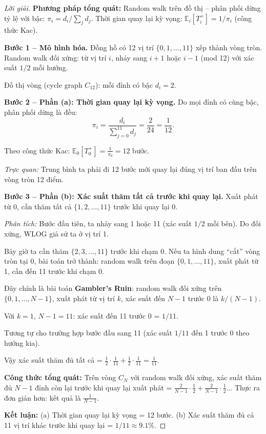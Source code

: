 \documentclass[8pt,a4paper]{article}
\newenvironment{solution}{\begin{proof}[Lời giải]}{\end{proof}}
\newcommand{\E}{\mathbb{E}}
\begin{document}
\begin{solution}
\textbf{Phương pháp tổng quát:} Random walk trên đồ thị -- phân phối dừng tỷ lệ với bậc: $\pi_i = d_i / \sum_j d_j$. Thời gian quay lại kỳ vọng: $\E_i[T_i^+] = 1/\pi_i$ (công thức Kac).

\textbf{Bước 1 -- Mô hình hóa.}
Đồng hồ có 12 vị trí $\{0, 1, \ldots, 11\}$ xếp thành vòng tròn. Random walk đối xứng: từ vị trí $i$, nhảy sang $i+1$ hoặc $i-1$ (mod 12) với xác suất $1/2$ mỗi hướng.

Đồ thị vòng (cycle graph $C_{12}$): mỗi đỉnh có bậc $d_i = 2$.

\textbf{Bước 2 -- Phần (a): Thời gian quay lại kỳ vọng.}
Do mọi đỉnh có cùng bậc, phân phối dừng là đều:
\[
  \pi_i = \frac{d_i}{\sum_{j=0}^{11} d_j} = \frac{2}{24} = \frac{1}{12}.
\]

Theo công thức Kac: $\E_0[T_0^+] = \frac{1}{\pi_0} = 12$ bước.

\textit{Trực quan:} Trung bình ta phải đi 12 bước mới quay lại đúng vị trí ban đầu trên vòng tròn 12 điểm.

\textbf{Bước 3 -- Phần (b): Xác suất thăm tất cả trước khi quay lại.}
Xuất phát từ 0, cần thăm tất cả $\{1, 2, \ldots, 11\}$ trước khi quay lại 0.

\textit{Phân tích:} Bước đầu tiên, ta nhảy sang 1 hoặc 11 (xác suất $1/2$ mỗi bên). Do đối xứng, WLOG giả sử ta ở vị trí 1.

Bây giờ ta cần thăm $\{2, 3, \ldots, 11\}$ trước khi chạm 0. Nếu ta hình dung ``cắt'' vòng tròn tại 0, bài toán trở thành: random walk trên đoạn $\{0, 1, \ldots, 11\}$, xuất phát từ 1, cần đến 11 trước khi chạm 0.

Đây chính là bài toán \textbf{Gambler's Ruin}: random walk đối xứng trên $\{0, 1, \ldots, N-1\}$, xuất phát từ vị trí $k$, xác suất đến $N-1$ trước 0 là $k/(N-1)$.

Với $k=1$, $N-1 = 11$: xác suất đến 11 trước 0 = $1/11$.

Tương tự cho trường hợp bước đầu sang 11 (xác suất $1/11$ đến 1 trước 0 theo hướng kia).

Vậy xác suất thăm đủ tất cả = $\frac{1}{2} \cdot \frac{1}{11} + \frac{1}{2} \cdot \frac{1}{11} = \frac{1}{11}$.

\textbf{Công thức tổng quát:} Trên vòng $C_N$ với random walk đối xứng, xác suất thăm đủ $N-1$ đỉnh còn lại trước khi quay lại xuất phát = $\frac{2}{N-1} \cdot \frac{1}{2} + \frac{2}{N-1}\cdot\frac{1}{2}$... Thực ra đơn giản hơn: kết quả là $\frac{1}{N-1}$.

\textbf{Kết luận:} (a) Thời gian quay lại kỳ vọng = 12 bước. (b) Xác suất thăm đủ cả 11 vị trí khác trước khi quay lại = $1/11 \approx 9.1\%$.
\end{solution}
\end{document}
